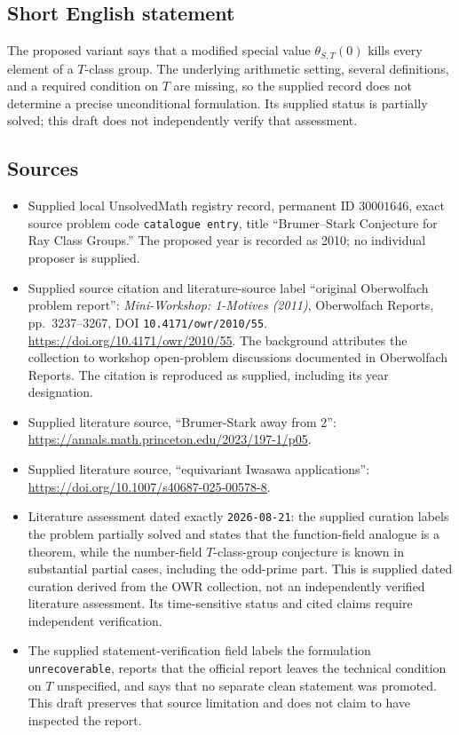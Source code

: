 \documentclass[11pt]{article}
\begin{document}
\subsection{Short English statement}
The proposed variant says that a modified special value \(\theta_{S,T}(0)\) kills every element of a \(T\)-class group. The underlying arithmetic setting, several definitions, and a required condition on \(T\) are missing, so the supplied record does not determine a precise unconditional formulation. Its supplied status is partially solved; this draft does not independently verify that assessment.
\subsection{Sources}
\begin{itemize}
\item Supplied local UnsolvedMath registry record, permanent ID \(30001646\), exact source problem code \texttt{catalogue entry}, title ``Brumer--Stark Conjecture for Ray Class Groups.'' The proposed year is recorded as 2010; no individual proposer is supplied.
\item Supplied source citation and literature-source label ``original Oberwolfach problem report'': \emph{Mini-Workshop: 1-Motives (2011)}, Oberwolfach Reports, pp.~3237--3267, DOI \texttt{10.4171/owr/2010/55}. \url{https://doi.org/10.4171/owr/2010/55}. The background attributes the collection to workshop open-problem discussions documented in Oberwolfach Reports. The citation is reproduced as supplied, including its year designation.
\item Supplied literature source, ``Brumer-Stark away from 2'': \url{https://annals.math.princeton.edu/2023/197-1/p05}.
\item Supplied literature source, ``equivariant Iwasawa applications'': \url{https://doi.org/10.1007/s40687-025-00578-8}.
\item Literature assessment dated exactly \texttt{2026-08-21}: the supplied curation labels the problem partially solved and states that the function-field analogue is a theorem, while the number-field \(T\)-class-group conjecture is known in substantial partial cases, including the odd-prime part. This is supplied dated curation derived from the OWR collection, not an independently verified literature assessment. Its time-sensitive status and cited claims require independent verification.
\item The supplied statement-verification field labels the formulation \texttt{unrecoverable}, reports that the official report leaves the technical condition on \(T\) unspecified, and says that no separate clean statement was promoted. This draft preserves that source limitation and does not claim to have inspected the report.
\end{itemize}
\end{document}
